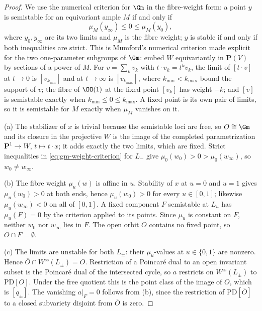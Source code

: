 \begin{proof}
We use the numerical criterion for \(\Gm\) in the fibre-weight form: a point
\(y\) is semistable for an equivariant ample \(M\) if and only if
\begin{equation}\label{eq:gm-weight-criterion}
 \mu_M(y_\infty)\leq 0\leq\mu_M(y_0),
\end{equation}
where \(y_0,y_\infty\) are its two limits and \(\mu_M\) is the fibre
weight; \(y\) is stable if and only if both inequalities are strict.  This
is Mumford's numerical criterion
\cite[Chapter~2, \S2.1, Theorem~2.1]{MumfordGIT} made explicit for the
two one-parameter subgroups of \(\Gm\): embed \(W\) equivariantly in
\(\mathbf P(V)\) by sections of a power of \(M\).  For
\(v=\sum_kv_k\) with \(t\cdot v_k=t^kv_k\), the limit of \([t\cdot v]\) at
\(t\to0\) is \([v_{k_{\min}}]\) and at \(t\to\infty\) is
\([v_{k_{\max}}]\), where \(k_{\min}<k_{\max}\) bound the support of \(v\);
the fibre of \(\OO(1)\) at the fixed point \([v_k]\) has weight \(-k\); and
\([v]\) is semistable exactly when \(k_{\min}\leq0\leq k_{\max}\).  A fixed
point is its own pair of limits, so it is semistable for \(M\) exactly when
\(\mu_M\) vanishes on it.

\textup{(a)}  The stabilizer of \(x\) is trivial because the semistable
loci are free, so \(O\cong\Gm\) and its closure in the projective \(W\) is
the image of the completed parametrization \(\mathbf P^1\to W\),
\(t\mapsto t\cdot x\); it adds exactly the two limits, which are fixed.
Strict inequalities in \eqref{eq:gm-weight-criterion} for \(L_-\) give
\(\mu_0(w_0)>0>\mu_0(w_\infty)\), so \(w_0\ne w_\infty\).

\textup{(b)}  The fibre weight \(\mu_u(w)\) is affine in \(u\).  Stability
of \(x\) at \(u=0\) and \(u=1\) gives \(\mu_u(w_0)>0\) at both ends, hence
\(\mu_u(w_0)>0\) for every \(u\in[0,1]\); likewise \(\mu_u(w_\infty)<0\) on
all of \([0,1]\).  A fixed component \(F\) semistable at \(L_u\) has
\(\mu_u(F)=0\) by the criterion applied to its points.  Since \(\mu_u\) is
constant on \(F\), neither \(w_0\) nor \(w_\infty\) lies in \(F\).  The
open orbit \(O\) contains no fixed point, so
\(\overline O\cap F=\emptyset\).

\textup{(c)}  The limits are unstable for both \(L_\pm\): their
\(\mu_u\)-values at \(u\in\{0,1\}\) are nonzero.  Hence
\(\overline O\cap W^{\mathrm{ss}}(L_\pm)=O\).  Restriction of a Poincar\'e
dual to an open invariant subset is the Poincar\'e dual of the intersected
cycle, so \(a\) restricts on \(W^{\mathrm{ss}}(L_\pm)\) to
\(\mathrm{PD}[O]\).  Under the free quotient this is the point class of the
image of \(O\), which is \([q_\pm]\).  The vanishing \(a|_F=0\) follows
from \textup{(b)}, since the restriction of \(\mathrm{PD}[\overline O]\) to
a closed subvariety disjoint from \(\overline O\) is zero.
\end{proof}


